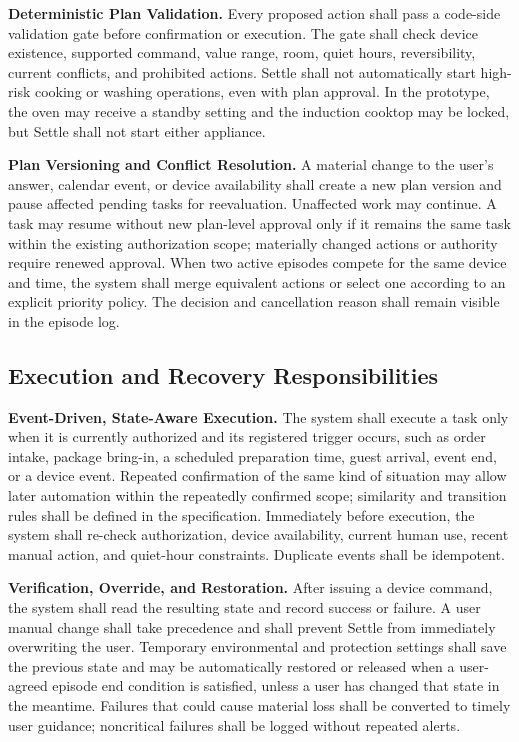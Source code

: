 \documentclass[conference]{IEEEtran}
\newcommand{\req}[1]{\par\addvspace{3pt}\noindent\textbf{#1}}
\begin{document}
\req{Deterministic Plan Validation.}
Every proposed action shall pass a code-side validation gate before confirmation or execution. The gate shall check device existence, supported command, value range, room, quiet hours, reversibility, current conflicts, and prohibited actions. Settle shall not automatically start high-risk cooking or washing operations, even with plan approval. In the prototype, the oven may receive a standby setting and the induction cooktop may be locked, but Settle shall not start either appliance.

\req{Plan Versioning and Conflict Resolution.}
A material change to the user's answer, calendar event, or device availability shall create a new plan version and pause affected pending tasks for reevaluation. Unaffected work may continue. A task may resume without new plan-level approval only if it remains the same task within the existing authorization scope; materially changed actions or authority require renewed approval. When two active episodes compete for the same device and time, the system shall merge equivalent actions or select one according to an explicit priority policy. The decision and cancellation reason shall remain visible in the episode log.

\subsection{Execution and Recovery Responsibilities}

\req{Event-Driven, State-Aware Execution.}
The system shall execute a task only when it is currently authorized and its registered trigger occurs, such as order intake, package bring-in, a scheduled preparation time, guest arrival, event end, or a device event. Repeated confirmation of the same kind of situation may allow later automation within the repeatedly confirmed scope; similarity and transition rules shall be defined in the specification. Immediately before execution, the system shall re-check authorization, device availability, current human use, recent manual action, and quiet-hour constraints. Duplicate events shall be idempotent.

\req{Verification, Override, and Restoration.}
After issuing a device command, the system shall read the resulting state and record success or failure. A user manual change shall take precedence and shall prevent Settle from immediately overwriting the user. Temporary environmental and protection settings shall save the previous state and may be automatically restored or released when a user-agreed episode end condition is satisfied, unless a user has changed that state in the meantime. Failures that could cause material loss shall be converted to timely user guidance; noncritical failures shall be logged without repeated alerts.
\end{document}
